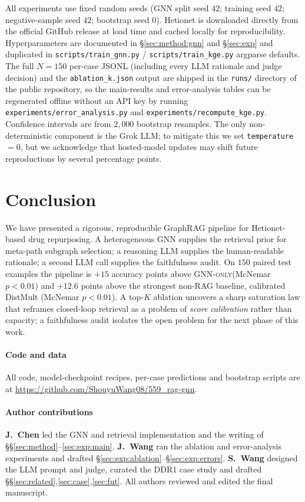 \documentclass{article}
\newcommand{\gnno}{\textsc{GNN-only}\xspace}
\begin{document}
All experiments use fixed random seeds (GNN split seed $42$; training seed $42$; negative-sample seed $42$; bootstrap seed $0$). Hetionet is downloaded directly from the official GitHub release at load time and cached locally for reproducibility. Hyperparameters are documented in \S\ref{sec:method:gnn} and \S\ref{sec:exp} and duplicated in \texttt{scripts/train\_gnn.py} / \texttt{scripts/train\_kge.py} argparse defaults. The full $N{=}150$ per-case JSONL (including every LLM rationale and judge decision) and the \texttt{ablation\_k.json} output are shipped in the \texttt{runs/} directory of the public repository, so the main-results and error-analysis tables can be regenerated offline without an API key by running \texttt{experiments/error\_analysis.py} and \texttt{experiments/recompute\_kge.py}. Confidence intervals are from $2{,}000$ bootstrap resamples. The only non-deterministic component is the Grok LLM; to mitigate this we set \texttt{temperature}\,$=0$, but we acknowledge that hosted-model updates may shift future reproductions by several percentage points.

\section{Conclusion}
\label{sec:conclusion}
We have presented a rigorous, reproducible GraphRAG pipeline for Hetionet-based drug repurposing. A heterogeneous GNN supplies the retrieval prior for meta-path subgraph selection; a reasoning LLM supplies the human-readable rationale; a second LLM call supplies the faithfulness audit. On $150$ paired test examples the pipeline is $+15$ accuracy points above \gnno (McNemar $p{<}0.01$) and $+12.6$ points above the strongest non-RAG baseline, calibrated DistMult (McNemar $p{<}0.01$). A top-$K$ ablation uncovers a sharp saturation law that reframes closed-loop retrieval as a problem of \emph{score calibration} rather than capacity; a faithfulness audit isolates the open problem for the next phase of this work.

\paragraph{Code and data}
All code, model-checkpoint recipes, per-case predictions and bootstrap scripts are at \url{https://github.com/ShouyuWang08/559_rag-gnn}.

\paragraph{Author contributions}
\textbf{J.\ Chen} led the GNN and retrieval implementation and the writing of \S\S\ref{sec:method}--\ref{sec:exp:main}. \textbf{J.\ Wang} ran the ablation and error-analysis experiments and drafted \S\ref{sec:exp:ablation}--\S\ref{sec:exp:errors}. \textbf{S.\ Wang} designed the LLM prompt and judge, curated the DDR1 case study and drafted \S\S\ref{sec:related},\ref{sec:case},\ref{sec:fut}. All authors reviewed and edited the final manuscript.


\end{document}
